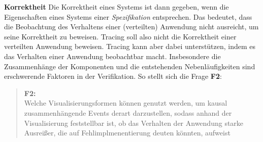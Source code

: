 \textbf{Korrektheit} \space\space\space Die Korrektheit eines Systems ist dann gegeben, wenn die Eigenschaften eines Systems einer \emph{Spezifikation} entsprechen. Das bedeutet, dass die Beobachtung des Verhaltens einer (verteilten) Anwendung nicht ausreicht, um seine Korrektheit zu beweisen. Tracing soll also nicht die Korrektheit einer verteilten Anwendung beweisen. Tracing kann aber dabei unterstützen, indem es das Verhalten einer Anwendung beobachtbar macht. Insbesondere die Zusammenhänge der Komponenten und die entstehenden Nebenläufigkeiten sind erschwerende Faktoren in der Verifikation. So stellt sich die Frage \textbf{F2}:

\begin{quote}
	\cbstart
	\textbf{F2:}\\
	Welche Visualisierungsformen können genutzt werden, um kausal zusammenhängende Events derart darzustellen, sodass anhand der Visualisierung feststellbar ist, ob das Verhalten der Anwendung starke Ausreißer, die auf Fehlimplmenentierung deuten könnten, aufweist
	\cbend
\end{quote}


